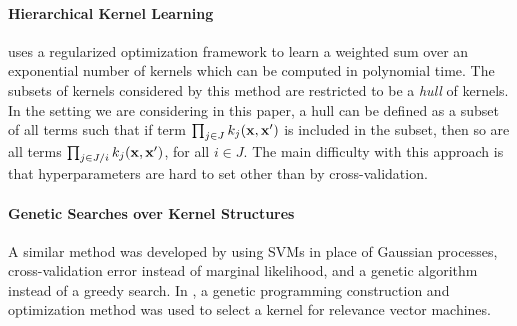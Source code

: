 \documentclass[twoside]{article}
\begin{document}
\paragraph{Hierarchical Kernel Learning}

\cite{DBLP:journals/corr/abs-0909-0844} uses a regularized optimization framework to learn a weighted sum over an exponential number of kernels which can be computed in polynomial time.
The subsets of kernels considered by this method are restricted to be a \textit{hull} of kernels. In the setting we are considering in this paper, a hull can be defined as a subset of all terms such that if term $\prod_{j \in J} k_j(\bf x, x')$ is included in the subset, then so are all terms $\prod_{j \in J / i} k_j(\bf x, x')$, for all $i \in J$.
%
The main difficulty with this approach is that hyperparameters are hard to set other than by cross-validation. 




\paragraph{Genetic Searches over Kernel Structures}
A similar method was developed by \cite{diosan2007evolving} using SVMs in place of Gaussian processes, cross-validation error instead of marginal likelihood, and a genetic algorithm instead of a greedy search.  
In \cite{bing2010gp}, a genetic programming construction and optimization method was used to select a kernel for relevance vector machines.
\end{document}

